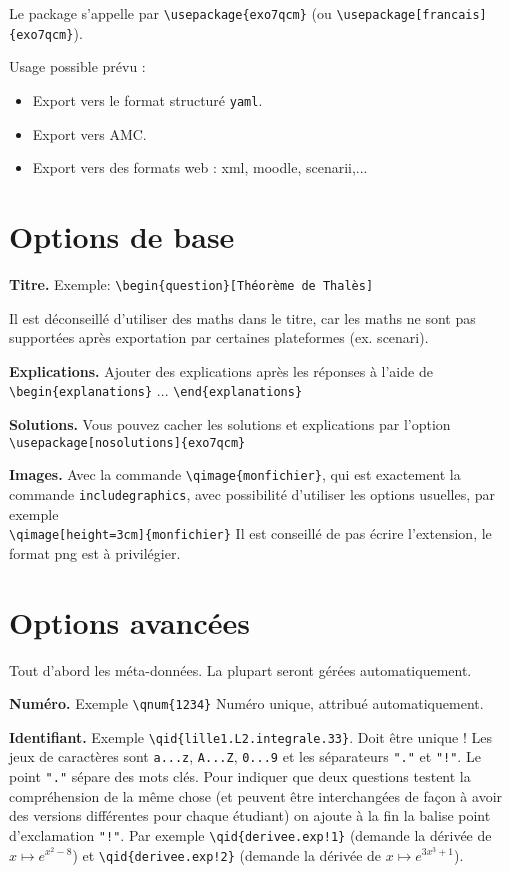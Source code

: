 \documentclass[12pt,a4paper]{article}
\begin{document}
Le package s'appelle par \verb|\usepackage{exo7qcm}| (ou \verb|\usepackage[francais]{exo7qcm}|).

Usage possible prévu  :
\begin{itemize}
  \item Export vers le format structuré \texttt{yaml}.
  \item Export vers AMC.
  \item Export vers des formats web : xml, moodle, scenarii,...
\end{itemize}

\section{Options de base}

\textbf{Titre.} Exemple: \verb|\begin{question}[Théorème de Thalès]|

Il est déconseillé d'utiliser des maths dans le titre, car les maths ne sont pas supportées après exportation par certaines plateformes (ex. scenari).


\bigskip
\textbf{Explications.} Ajouter des explications après les réponses à l'aide de
\verb|\begin{explanations}| ... \verb|\end{explanations}|

\bigskip
\textbf{Solutions.} Vous pouvez cacher les solutions et explications par l'option \\
\verb|\usepackage[nosolutions]{exo7qcm}|

\bigskip
\textbf{Images.} Avec la commande \verb|\qimage{monfichier}|, qui est exactement la commande \verb|includegraphics|, avec possibilité d'utiliser les options usuelles, par exemple \\
\verb|\qimage[height=3cm]{monfichier}|
Il est conseillé de pas écrire l'extension, le format png est à privilégier.


\section{Options avancées}

Tout d'abord les méta-données. La plupart seront gérées automatiquement.

\bigskip
\textbf{Numéro.} Exemple \verb|\qnum{1234}| Numéro unique, attribué automatiquement.


\bigskip
\textbf{Identifiant.} Exemple \verb|\qid{lille1.L2.integrale.33}|. Doit être unique ! 
Les jeux de caractères sont \texttt{a...z}, \texttt{A...Z}, \texttt{0...9} et les séparateurs \texttt{"."} et \texttt{"!"}. Le point \texttt{"."} sépare des mots clés. 
Pour indiquer que deux questions testent la compréhension de la même chose (et peuvent être interchangées de façon à avoir des versions différentes pour chaque étudiant) on ajoute à la fin la balise point d'exclamation \texttt{"!"}.
Par exemple \verb|\qid{derivee.exp!1}| (demande la dérivée de $x \mapsto e^{x^2-8}$)
et \verb|\qid{derivee.exp!2}| (demande la dérivée de $x \mapsto e^{3x^3+1}$).
\end{document}
